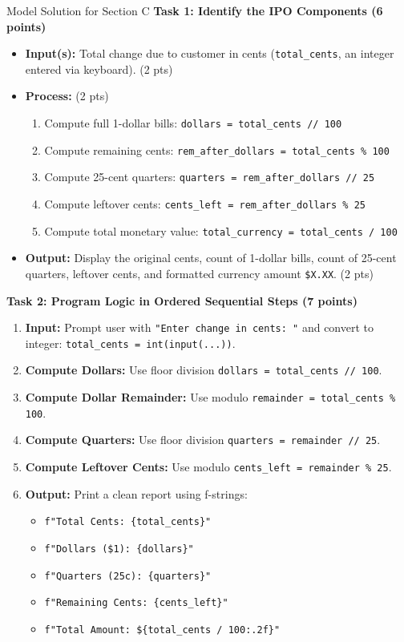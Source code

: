 \documentclass[11pt,a4paper]{article}
\begin{document}
\begin{solbox}{Model Solution for Section C}
\textbf{Task 1: Identify the IPO Components (6 points)}
\begin{itemize}[leftmargin=2em]
  \item \textbf{Input(s):} Total change due to customer in cents (\texttt{total\_cents}, an integer entered via keyboard). (2 pts)
  \item \textbf{Process:} (2 pts)
    \begin{enumerate}[label=\arabic*.]
      \item Compute full 1-dollar bills: \texttt{dollars = total\_cents // 100}
      \item Compute remaining cents: \texttt{rem\_after\_dollars = total\_cents \% 100}
      \item Compute 25-cent quarters: \texttt{quarters = rem\_after\_dollars // 25}
      \item Compute leftover cents: \texttt{cents\_left = rem\_after\_dollars \% 25}
      \item Compute total monetary value: \texttt{total\_currency = total\_cents / 100}
    \end{enumerate}
  \item \textbf{Output:} Display the original cents, count of 1-dollar bills, count of 25-cent quarters, leftover cents, and formatted currency amount \texttt{\$X.XX}. (2 pts)
\end{itemize}

\vspace{0.2cm}
\textbf{Task 2: Program Logic in Ordered Sequential Steps (7 points)}
\begin{enumerate}[leftmargin=2em, label=Step \arabic*:]
  \item \textbf{Input:} Prompt user with \texttt{"Enter change in cents: "} and convert to integer: \texttt{total\_cents = int(input(...))}.
  \item \textbf{Compute Dollars:} Use floor division \texttt{dollars = total\_cents // 100}.
  \item \textbf{Compute Dollar Remainder:} Use modulo \texttt{remainder = total\_cents \% 100}.
  \item \textbf{Compute Quarters:} Use floor division \texttt{quarters = remainder // 25}.
  \item \textbf{Compute Leftover Cents:} Use modulo \texttt{cents\_left = remainder \% 25}.
  \item \textbf{Output:} Print a clean report using f-strings:
    \begin{itemize}
      \item \texttt{f"Total Cents: \{total\_cents\}"}
      \item \texttt{f"Dollars (\$1): \{dollars\}"}
      \item \texttt{f"Quarters (25c): \{quarters\}"}
      \item \texttt{f"Remaining Cents: \{cents\_left\}"}
      \item \texttt{f"Total Amount: \$\{total\_cents / 100:.2f\}"}
    \end{itemize}
\end{enumerate}


\end{solbox}
\end{document}
